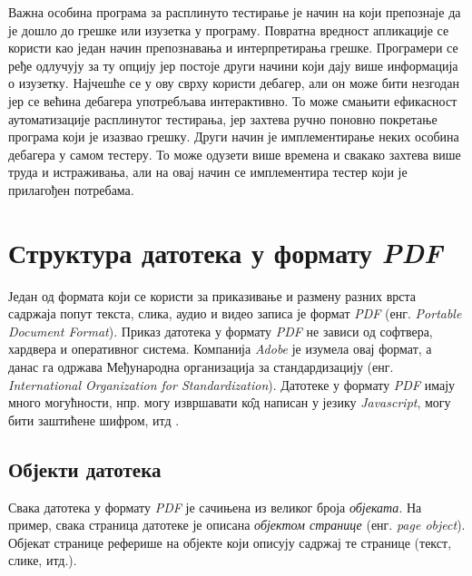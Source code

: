 \documentclass[12pt,oneside]{memoir}
\begin{document}
Важна особина програма за расплинуто тестирање је начин на који препознаје да је дошло до грешке или изузетка у програму. Повратна вредност апликације се користи као један начин препознавања и  интерпретирања грешке. Програмери се ређе одлучују за ту опцију јер постоје други начини који дају више информација о изузетку. Најчешће се у ову сврху користи дебагер, али он може бити незгодан јер се већина дебагера употребљава интерактивно. То може смањити ефикасност аутоматизације расплинутог тестирања, јер захтева ручно поновно покретање програма који је изазвао грешку. Други начин је имплементирање неких особина дебагера у самом тестеру. То може одузети више времена и свакако захтева више труда и истраживања, али на овај начин се имплементира тестер који је прилагођен потребама.

\chapter{Структура датотека у формату \textit{PDF}}
\label{chp:pdfStruktura}

Један од формата који се користи за приказивање и размену разних врста садржаја попут текста, слика, аудио и видео записа је формат \textit{PDF} (енг. \textit{Portable Document Format}). Приказ датотека у формату \textit{PDF} не зависи од софтвера, хардвера и оперативног система. Компанија \textit{Adobe} је изумела овај формат, а данас га одржава Међународна организација за стандардизацију (енг. \textit{International Organization for Standardization}). Датотеке у формату \textit{PDF} имају много могућности, нпр. могу извршавати к\^{о}д написан у језику \textit{Javascript}, могу бити заштићене шифром, итд \cite{adobePdf1, adobePdf2}.

\section{Објекти датотека}
\label{sec:objektiPDF}

Свака датотека у формату \textit{PDF} је сачињена из великог броја \textit{објеката}. На пример, свака страница датотеке је описана \textit{објектом странице} (енг. \textit{page object}). Објекат странице реферише на објекте који описују садржај те странице (текст, слике, итд.).
\end{document}
